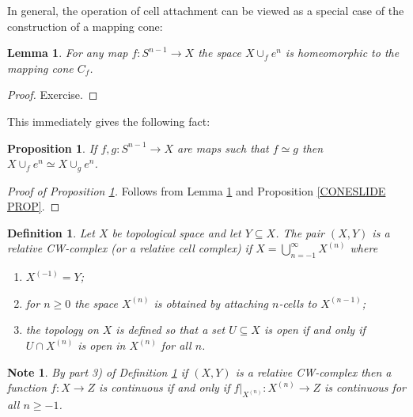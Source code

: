 \documentclass[11pt, letterpaper, oneside]{report}
\theoremstyle{pplain}
\newtheorem{lemma}[theorem]{Lemma}
\newtheorem{proposition}[theorem]{Proposition}
\theoremstyle{ddefinition}
\newtheorem{definition}[theorem]{Definition}
\newtheorem{note}[theorem]{Note}
\theoremstyle{nnn}
\theoremstyle{eexercise}
\newcommand{\benu}{\begin{enumerate}}
\newcommand{\eenu}{\end{enumerate}}
\begin{document}
In general, the operation of cell attachment can be viewed as a special case of the construction of 
a mapping cone:


\begin{lemma}
\label{CONEEQCELL LEMMA}
For any map $f\colon S^{n-1}\to X$ the space $X\cup_{f} e^{n}$ is homeomorphic to 
the mapping cone $C_{f}$. 
\end{lemma}

\begin{proof}
Exercise. 
\end{proof}

This immediately gives the following fact:

\begin{proposition}
\label{CELLSLIDE PROP}
If $f, g\colon S^{n-1}\to X$ are maps such that $f\simeq g$ then $X\cup_{f} e^{n} \simeq X\cup_{g} e^{n}$. 
\end{proposition}





\begin{proof}[Proof of Proposition \ref{CELLSLIDE PROP}]
Follows from Lemma \ref{CONEEQCELL LEMMA} and Proposition \ref{CONESLIDE PROP}.
\end{proof}



\begin{definition}
\label{RELCW DEF}
Let $X$ be topological space and let $Y\subseteq X$. The pair $(X, Y)$ is 
a \emph{relative CW-complex} (or a \emph{relative cell complex}) if $X = \bigcup_{n=-1}^{\infty} X^{(n)}$
where 
\benu
\item[1)]
$X^{(-1)} = Y$;
\item[2)] for $n\geq 0$ the space $X^{(n)}$ is obtained by attaching $n$-cells to $X^{(n-1)}$;
\item[3)] the topology on $X$ is defined so that a set $U\subseteq X$ is open if and only if
$U\cap X^{(n)}$ is open in $X^{(n)}$ for all $n$. 
\eenu
\end{definition}

\begin{note}
By part 3) of Definition \ref{RELCW DEF} if $(X, Y)$ is a relative CW-complex then a function 
$f\colon X\to Z$ is continuous if and only if $f|_{X^{(n)}}\colon X^{(n)} \to Z$ is continuous for all $n\geq -1$. 
\end{note}
\end{document}
